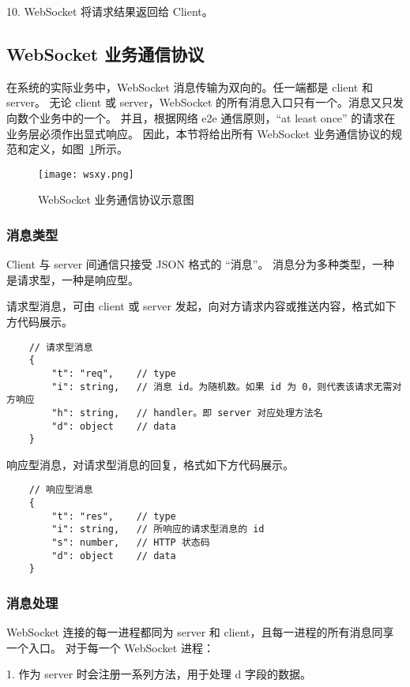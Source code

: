 10. WebSocket 将请求结果返回给 Client。

  \subsection{WebSocket 业务通信协议}
  在系统的实际业务中，WebSocket 消息传输为双向的。任一端都是 client 和 server。
无论 client 或 server，WebSocket 的所有消息入口只有一个。消息又只发向数个业务中的一个。
并且，根据网络 e2e 通信原则，“at least once” 的请求在业务层必须作出显式响应。
因此，本节将给出所有 WebSocket 业务通信协议的规范和定义，如图~\ref{fig:wsxy}所示。

\begin{figure}[!htp]
    \centering
    \texttt{[image: wsxy.png]}
    \caption{WebSocket 业务通信协议示意图}
    \label{fig:wsxy}
  \end{figure}

  \subsubsection{消息类型}
  Client 与 server 间通信只接受 JSON 格式的 “消息”。
  消息分为多种类型，一种是请求型，一种是响应型。

  请求型消息，可由 client 或 server 发起，向对方请求内容或推送内容，格式如下方代码展示。
  {\setmainfont{Courier New Bold}
\begin{lstlisting}
    // 请求型消息
    {
        "t": "req",    // type
        "i": string,   // 消息 id。为随机数。如果 id 为 0，则代表该请求无需对方响应
        "h": string,   // handler。即 server 对应处理方法名
        "d": object    // data
    }
 \end{lstlisting}}

 响应型消息，对请求型消息的回复，格式如下方代码展示。
 {\setmainfont{Courier New Bold}
 \begin{lstlisting}
    // 响应型消息
    {
        "t": "res",    // type
        "i": string,   // 所响应的请求型消息的 id
        "s": number,   // HTTP 状态码
        "d": object    // data
    }
  \end{lstlisting}}

  \subsubsection{消息处理}
  WebSocket 连接的每一进程都同为 server 和 client，且每一进程的所有消息同享一个入口。
对于每一个 WebSocket 进程：

1. 作为 server 时会注册一系列方法，用于处理 d 字段的数据。

